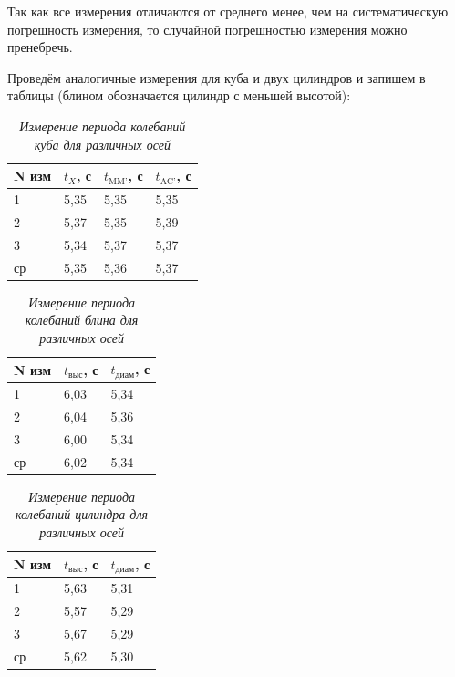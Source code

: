 \documentclass[a4paper,12pt]{article}
\begin{document}
Так как все измерения отличаются от среднего менее, чем на систематическую погрешность измерения, то случайной погрешностью измерения можно пренебречь.

Проведём аналогичные измерения для куба и двух цилиндров и запишем в таблицы (блином обозначается цилиндр с меньшей высотой):

\begin{table}[!ht]
    \centering
    \begin{tabular}{|l|l|l|l|}
    \hline
        N изм  & $t_X$, с & $t_\text{MM'}$, с & $t_\text{AC'}$, с \\ \hline
        1  & 5,35 & 5,35 & 5,35  \\ \hline
        2  & 5,37 & 5,35 & 5,39  \\ \hline
        3  & 5,34 & 5,37 & 5,37  \\ \hline
        ср & 5,35 & 5,36 & 5,37  \\ \hline
    \end{tabular}\caption{\textit{Измерение периода колебаний куба для различных осей}}\label{cube-t}
\end{table}

\begin{table}[!ht]
    \centering
    \begin{tabular}{|l|l|l|}
    \hline
        N изм  & $t_\text{выс}$, с & $t_\text{диам}$, с \\ \hline
        1  & 6,03 & 5,34  \\ \hline
        2  & 6,04 & 5,36  \\ \hline
        3  & 6,00 & 5,34  \\ \hline
        ср & 6,02 & 5,34  \\ \hline
    \end{tabular}\caption{\textit{Измерение периода колебаний блина для различных осей}}\label{cilinder1}
\end{table}

\begin{table}[!ht]
    \centering
    \begin{tabular}{|l|l|l|}
    \hline
        N изм  & $t_\text{выс}$, с & $t_\text{диам}$, с \\ \hline
        1  & 5,63 & 5,31  \\ \hline
        2  & 5,57 & 5,29  \\ \hline
        3  & 5,67 & 5,29  \\ \hline
        ср & 5,62 & 5,30  \\ \hline
    \end{tabular}\caption{\textit{Измерение периода колебаний цилиндра для различных осей}}\label{cilinder1}
\end{table}
\end{document}
